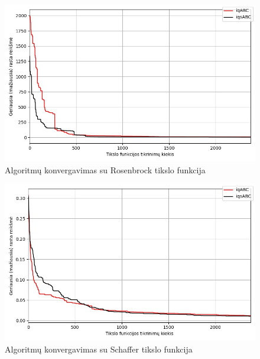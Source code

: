 \documentclass{VUMIFKompMagistrinis}
\begin{document}
\begin{landscape}
\begin{multicols}{2}
\begin{figure}[H]
    \centering
    \includegraphics[scale=0.5]{img/2kg/rosenbrock.jpg}
     \caption{Algoritmų konvergavimas su Rosenbrock tikslo funkcija}
    \label{img:vkon6}
\end{figure}

\begin{figure}[H]
    \centering
    \includegraphics[scale=0.5]{img/2kg/Schaffer.jpg}
     \caption{Algoritmų konvergavimas su Schaffer tikslo funkcija}
    \label{img:vkon7}
\end{figure}


\end{multicols}\newpage
\begin{multicols}{2}



\end{multicols}
\end{landscape}
\end{document}

